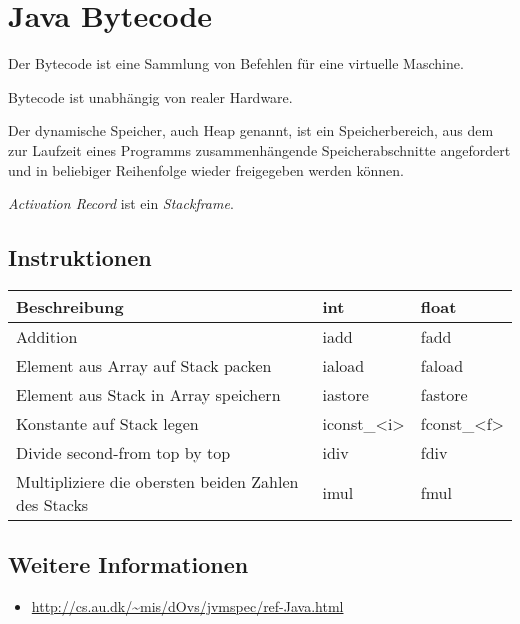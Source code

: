 \chapter{Java Bytecode}
\begin{definition}[Bytecode]%
    Der Bytecode ist eine Sammlung von Befehlen für eine virtuelle Maschine.
\end{definition}

Bytecode ist unabhängig von realer Hardware.

\begin{definition}[Heap]%
    Der dynamische Speicher, auch Heap genannt, ist ein Speicherbereich, aus dem
    zur Laufzeit eines Programms zusammenhängende Speicherabschnitte angefordert
    und in beliebiger Reihenfolge wieder freigegeben werden können.
\end{definition}



\textit{Activation Record} ist ein \textit{Stackframe}.
\section{Instruktionen}
\begin{table}[h]
    \begin{tabular}{p{6cm}|ll}
    \textbf{Beschreibung}                               & \textbf{int} & \textbf{float} \\ \hline
    Addition                                            & iadd         & fadd           \\
    Element aus Array auf Stack packen                  & iaload       & faload         \\
    Element aus Stack in Array speichern                & iastore      & fastore        \\
    Konstante auf Stack legen                           & iconst\_<i>  & fconst\_<f> \\
    Divide second-from top by top                       & idiv         & fdiv           \\
    Multipliziere die obersten beiden Zahlen des Stacks & imul         & fmul           \\
    \end{tabular}
\end{table}

\section{Weitere Informationen}
\begin{itemize}
    \item \url{http://cs.au.dk/~mis/dOvs/jvmspec/ref-Java.html}
\end{itemize}
